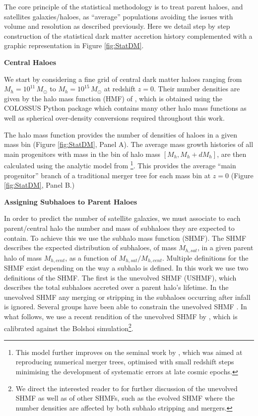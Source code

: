 The core principle of the statistical methodology is to treat parent haloes, and satellites galaxies/haloes, as ``average'' populations avoiding the issues with volume and resolution as described previously. Here we detail step by step construction of the statistical dark matter accretion history complemented with a graphic representation in Figure \ref{fig:StatDM}.

\textbf{Central Haloes}

We start by considering a fine grid of central dark matter haloes ranging from $M_{h}=10^{11}\, M_{\odot}$ to $M_{h}=10^{15}\, M_{\odot}$ at redshift $z=0$. Their number densities are given by the halo mass function (HMF) of \citet{Despali2016TheDefinitions}, which is obtained using the COLOSSUS Python package \citep{Diemer2017COLOSSUS:Halos} which contains many other halo mass functions as well as spherical over-density conversions required throughout this work. 

The halo mass function provides the number of densities of haloes in a given mass bin (Figure \ref{fig:StatDM}, Panel A).
The average mass growth histories of all main progenitors with mass in the bin of halo mass $[M_{h},M_{h}+dM_{h}]$, are then calculated using the analytic model from \cite{vandenBosch2014ComingWells}\footnote{This model further improves on the seminal work by \citet{Parkinson2008GeneratingTrees}, which was aimed at reproducing numerical merger trees, optimised with small redshift steps minimising the development of systematic errors at late cosmic epochs.}. This provides the average ``main progenitor'' branch of a traditional merger tree for each mass bin at $z = 0$ (Figure \ref{fig:StatDM}, Panel B.)

\textbf{Assigning Subhaloes to Parent Haloes}

In order to predict the number of satellite galaxies, we must associate to each parent/central halo the number and mass of subhaloes they are expected to contain. To achieve this we use the subhalo mass function (SHMF). The SHMF describes the expected distribution of subhaloes, of mass $M_{h,sat}$, in a given parent halo of mass $M_{h,cent}$, as a function of $M_{h,sat}/M_{h,cent}$. Multiple definitions for the SHMF exist depending on the way a subhalo is defined. In this work we use two definitions of the SHMF. The first is the unevolved SHMF (USHMF), which describes the total subhaloes accreted over a parent halo's lifetime. In the unevolved SHMF any merging or stripping in the subhaloes occurring after infall is ignored. Several groups have been able to constrain the unevolved SHMF \citep{Giocoli2008AnalyticalHaloes,Jiang2016StatisticsFunctions}. In what follows, we use a recent rendition of the unevolved SHMF by \citet{Jiang2016StatisticsFunctions}, which is calibrated against the Bolshoi simulation\footnote{We direct the interested reader to \citet{Jiang2016StatisticsFunctions} for further discussion of the unevolved SHMF as well as of other SHMFs, such as the evolved SHMF where the number densities are affected by both subhalo stripping and mergers.}.

